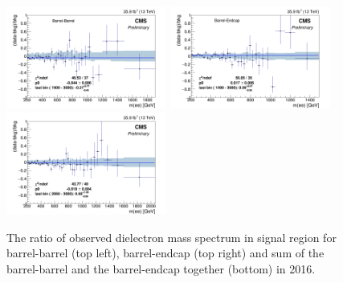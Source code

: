 \begin{figure}
  \begin{center}
    \includegraphics[width=0.47\textwidth]{figures/Zprime/2016/mass/SignalRegionHistEBEB_ratio}
    \includegraphics[width=0.47\textwidth]{figures/Zprime/2016/mass/SignalRegionHistEBEE_ratio}
    \includegraphics[width=0.47\textwidth]{figures/Zprime/2016/mass/SignalRegionHist_ratio}
    \caption{The ratio of observed dielectron mass spectrum in signal region for barrel-barrel (top left), barrel-endcap (top right) and sum of the barrel-barrel and the barrel-endcap together (bottom) in 2016.}
    \label{massratio_2016}
  \end{center}
\end{figure}

